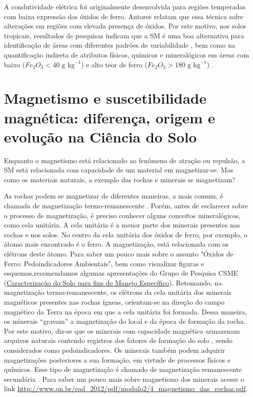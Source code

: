 A condutividade elétrica foi originalmente desenvolvida para regiões temperadas com baixa expressão dos óxidos de ferro. Autores \citep{wu:2008} relatam que essa técnica sofre alterações em regiões com elevada presença de óxidos. Por este motivo, nos solos tropicais, resultados de pesquisas indicam que a SM é uma boa alternativa para identificação de áreas com diferentes padrões de variabilidade \citep{camargo:2013}, bem como na quantificação indireta de atributos físicos, químicos e mineralógicos em áreas com baixo ($Fe_{2}O_{3}<40\text{ g kg}^{-1}$) \citep{siqueira:2010} e alto teor de ferro ($Fe_{2}O_{3}>180\text{ g kg}^{-1}$) \citep{peluco:2013}.




\section{Magnetismo e suscetibilidade magnética: diferença, origem e evolução na Ciência do Solo}
\label{sec:2}




Enquanto o magnetismo está relacionado ao fenômeno de atração ou repulsão, a SM está relacionada com capacidade de um material em magnetizar-se. Mas como os materiais naturais, a exemplo das rochas e minerais se magnetizam?




As rochas podem se magnetizar de diferentes maneiras, a mais comum, é chamada de magnetização termo-remanescente \citep{press:2006}. Porém, antes de esclarecer sobre o processo de magnetização, é preciso conhecer alguns conceitos mineralógicos, como cela unitária. A cela unitária é a menor parte dos minerais presentes nas rochas e nos solos. No centro da cela unitária dos óxidos de ferro, por exemplo, o átomo mais encontrado é o ferro. A magnetização, está relacionada com os elétrons deste átomo. Para saber um pouco mais sobre o assunto "Óxidos de Ferro: Pedoindicadores Ambientais", bem como visualizar figuras e esquemas,recomendamos algumas apresentações do Grupo de Pesquisa CSME (\href{http://www.acervodigital.unesp.br/handle/123456789/40434}{Caracterização do Solo para fins de Manejo Específico}). Retomando, na magnetização termo-remanescente, os elétrons da cela unitária dos minerais magnéticos presentes nas rochas ígneas, orientam-se na direção do campo magnético da Terra na época em que a cela unitária foi formada. Dessa maneira, os minerais ``gravam'' a magnetização do local e da época de formação da rocha. Por este motivo, diz-se que os minerais com capacidade magnética armazenam arquivos naturais contendo registros dos fatores de formação do solo \citep{maher-thompson:1999}, sendo considerados como pedoindicadores. Os minerais também podem adquirir magnetizações posteriores a sua formação, em virtude de processos físicos e químicos. Esse tipo de magnetização é chamado de magnetização remanescente secundária \citep{teixeira:2009}. Para saber um pouco mais sobre magnetismo dos minerais acesse o link \url{http://www.on.br/ead_2012/pdf/modulo2/4_magnetismo_das_rochas.pdf}.




